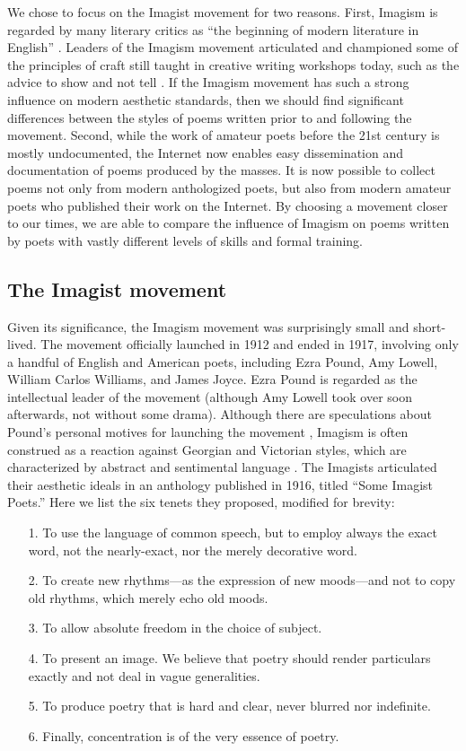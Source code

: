 \documentclass{book}
\begin{document}
We chose to focus on the Imagist movement for two reasons. First, Imagism is regarded by many literary critics as ``the beginning of modern literature in English'' \citep{pratt1992imagism}. Leaders of the Imagism movement articulated and championed some of the principles of craft still taught in creative writing workshops today, such as the advice to show and not tell \citep{PoetsCompanion, Burroway}. If the Imagism movement has such a strong influence on modern aesthetic standards, then we should find significant differences between the styles of poems written prior to and following the movement. Second, while the work of amateur poets before the 21st century is mostly undocumented, the Internet now enables easy dissemination and documentation of poems produced by the masses. It is now possible to collect poems not only from modern anthologized poets, but also from modern amateur poets who published their work on the Internet. By choosing a movement closer to our times, we are able to compare the influence of Imagism on poems written by poets with vastly different levels of skills and formal training. 

\subsection*{The Imagist movement}

Given its significance, the Imagism movement was surprisingly small and short-lived. The movement officially launched in 1912 and ended in 1917, involving only a handful of English and American poets, including Ezra Pound, Amy Lowell, William Carlos Williams, and James Joyce. Ezra Pound is regarded as the intellectual leader of the movement (although Amy Lowell took over soon afterwards, not without some drama). Although there are speculations about Pound's personal motives for launching the movement \citep{thacker2011imagist}, Imagism is often construed as a reaction against Georgian and Victorian styles, which are characterized by abstract and sentimental language \citep{frank1991idea}. The Imagists articulated their aesthetic ideals in an anthology published in 1916, titled ``Some Imagist Poets.'' Here we list the six tenets they proposed, modified for brevity:
\begin{itemize}
\item[1.] To use the language of common speech, but to employ always the exact word, not the nearly-exact, nor the merely decorative word.
\item[2.] To create new rhythms---as the expression of new moods---and not to copy old rhythms, which merely echo old moods. 
\item[3.] To allow absolute freedom in the choice of subject.
\item[4.] To present an image. We believe that poetry should render particulars exactly and not deal in vague generalities.
\item[5.] To produce poetry that is hard and clear, never blurred nor indefinite.
\item[6.] Finally, concentration is of the very essence of poetry.
\end{itemize}
\end{document}

